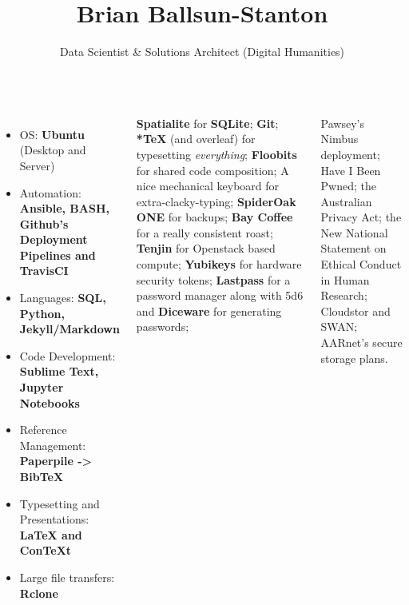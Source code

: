 \documentclass[17pt, a2paper, portrait]{tikzposter}
\title{Brian Ballsun-Stanton}
\author{Data Scientist \& Solutions Architect (Digital Humanities)}
\institute{Faculty of Arts, Macquarie University~\textbullet~\tt{brian.ballsun-stanton@mq.edu.au} }
\begin{document}
\maketitle

\begin{columns}
%

{
\begin{itemize}
    \item OS: \textbf{Ubuntu} (Desktop and Server)
    \item Automation: \textbf{Ansible, BASH, Github's Deployment Pipelines and TravisCI}
    \item Languages: \textbf{SQL, Python, Jekyll/Markdown}
    \item Code Development: \textbf{Sublime Text, Jupyter Notebooks}
    \item Reference Management: \textbf{Paperpile -> Bib\TeX{}}
    \item Typesetting and Presentations: \textbf{\LaTeX{} and Con\TeX t}
    \item Large file transfers: \textbf{Rclone}
\end{itemize}
}
{
\textbf{Spatialite} for \textbf{SQLite}; \textbf{Git}; \textbf{*\TeX} (and overleaf) for typesetting \textit{everything}; \textbf{Floobits} for shared code composition; A nice mechanical keyboard for extra-clacky-typing; \textbf{SpiderOak ONE} for backups; \textbf{Bay Coffee} for a really consistent roast; \textbf{Tenjin} for Openstack based compute; \textbf{Yubikeys} for hardware security tokens; \textbf{Lastpass} for a password manager along with 5d6 and \textbf{Diceware} for generating passwords; 
}
{
 Pawsey's Nimbus deployment; Have I Been Pwned; the Australian Privacy Act; the New National Statement on Ethical Conduct in Human Research; Cloudstor and SWAN; AARnet's secure storage plans.

}
\end{columns}
\end{document}
